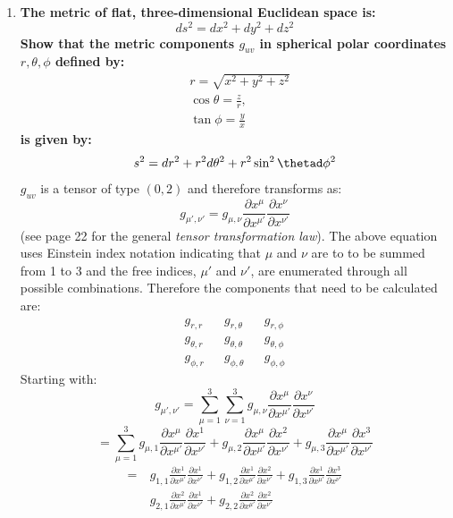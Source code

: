 \documentclass[9pt]{report}
\begin{document}
\begin{enumerate}
\begin{enumerate}
  \item \textbf{The metric of flat, three-dimensional Euclidean space is:} \[
      ds^2 = dx^2 + dy^2 + dz^2
  \]
  \textbf{Show that the metric components $g_{uv}$ in spherical polar
  coordinates $r, \theta, \phi$ defined by:}
  \[
    \begin{align*}
      &r = \sqrt{x^2 + y^2 + z^2} \\
      &\cos\theta = \frac{z}{r}, \\
      &\tan\phi = \frac{y}{x}
    \end{align*}
  \]
  \textbf{is given by:}
  \[
    s^2 = dr^2 + r^2 d\theta^2 + r^2 \sin^2\thetad\phi^2
  \]
 $g_{uv}$ is a tensor of type $\left( 0,2 \right) $ and therefore transforms as:
  \[
    g_{\mu',\nu'} = g_{\mu,\nu} \frac{\partial x^\mu}{\partial x^{\mu'}}\frac{\partial x^\nu}{\partial x^{\nu'}}
  \]
  (see page 22 for the general \textit{tensor transformation law}). The above
  equation uses Einstein index notation indicating that $\mu$ and $\nu$ are to
  to be summed from 1 to 3 and the free indices, $\mu'$ and $\nu'$, are
  enumerated through all possible combinations. Therefore the components that
  need to be calculated are:
  \[
    \begin{matrix}
      g_{r,r}  && g_{r,\theta} && g_{r,\phi} \\
      g_{\theta, r} && g_{\theta,\theta} && g_{\theta,\phi} \\
      g_{\phi,r} && g_{\phi,\theta} && g_{\phi,\phi}
    \end{matrix}
  \]
  Starting with:
  \[
    g_{\mu',\nu'} =
    \sum_{\mu=1}^{3} \sum_{\nu=1}^{3} g_{\mu,\nu} \frac{\partial x^\mu}{\partial x^{\mu'}} \frac{\partial x^\nu}{\partial x^{\nu'}}
  \]
  \[
    = \sum_{\mu=1}^{3}
    g_{\mu, 1} \frac{\partial x^\mu}{\partial x^{\mu'}} \frac{\partial x^1}{\partial x^{\nu'}} +
    g_{\mu, 2} \frac{\partial x^\mu}{\partial x^{\mu'}} \frac{\partial x^2}{\partial x^{\nu'}} +
    g_{\mu, 3} \frac{\partial x^\mu}{\partial x^{\mu'}} \frac{\partial x^3}{\partial x^{\nu'}}
  \]
  \[
    \begin{align*}
    =&\
     g_{1,1}\frac{\partial x^1}{\partial x^{\mu'}}\frac{\partial x^1}{\partial x^{\nu'}}
    +g_{1,2}\frac{\partial x^1}{\partial x^{\mu'}}\frac{\partial x^2}{\partial x^{\nu'}}
    +g_{1,3}\frac{\partial x^1}{\partial x^{\mu'}}\frac{\partial x^3}{\partial x^{\nu'}}\\
    &\ g_{2,1}\frac{\partial x^2}{\partial x^{\mu'}}\frac{\partial x^1}{\partial x^{\nu'}}
    +g_{2,2}\frac{\partial x^2}{\partial x^{\mu'}}\frac{\partial x^2}{\partial x^{\nu'}}

\end{align*}\]
\end{enumerate}
\end{enumerate}
\end{document}
